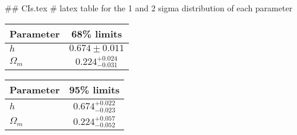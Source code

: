 ## CIs.tex
# latex table for the 1 and 2 sigma distribution of each parameter

\begin{tabular} { l  c}
 Parameter &  68\% limits\\
\hline
{\boldmath$h              $} & $0.674\pm 0.011            $\\
{\boldmath$\Omega_m       $} & $0.224^{+0.024}_{-0.031}   $\\
\hline
\end{tabular}

\begin{tabular} { l  c}
 Parameter &  95\% limits\\
\hline
{\boldmath$h              $} & $0.674^{+0.022}_{-0.023}   $\\
{\boldmath$\Omega_m       $} & $0.224^{+0.057}_{-0.052}   $\\
\hline
\end{tabular}
